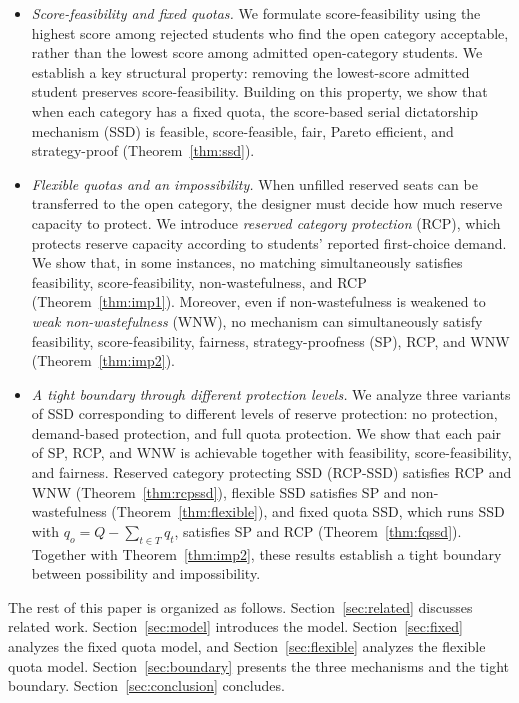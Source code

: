 \documentclass[a4paper,twoside]{article}
\theoremstyle{definition}
\begin{document}
\begin{itemize}
\item \emph{Score-feasibility and fixed quotas.}
We formulate score-feasibility using the highest score among
rejected students who find the open category acceptable, rather
than the lowest score among admitted open-category students.
We establish a key structural property: removing the lowest-score
admitted student preserves score-feasibility.
Building on this property, we show that when each category has
a fixed quota, the score-based serial dictatorship mechanism (SSD)
is feasible, score-feasible, fair, Pareto efficient, and
strategy-proof (Theorem~\ref{thm:ssd}).
\item \emph{Flexible quotas and an impossibility.}
When unfilled reserved seats can be transferred to the open
category, the designer must decide how much reserve capacity
to protect.
We introduce \emph{reserved category protection} (RCP),
which protects reserve capacity according to students'
reported first-choice demand.
We show that, in some instances, no matching simultaneously
satisfies feasibility, score-feasibility, non-wastefulness,
and RCP (Theorem~\ref{thm:imp1}).
Moreover, even if non-wastefulness is weakened to
\emph{weak non-wastefulness} (WNW), no mechanism
can simultaneously satisfy feasibility, score-feasibility,
fairness, strategy-proofness (SP), RCP, and WNW
(Theorem~\ref{thm:imp2}).
\item \emph{A tight boundary through different protection levels.}
We analyze three variants of SSD corresponding to different
levels of reserve protection: no protection, demand-based
protection, and full quota protection.
We show that each pair of SP, RCP, and WNW is achievable
together with feasibility, score-feasibility, and fairness.
Reserved category protecting SSD (RCP-SSD) satisfies RCP and WNW
(Theorem~\ref{thm:rcpssd}),
flexible SSD satisfies SP and non-wastefulness
(Theorem~\ref{thm:flexible}), and
fixed quota SSD, which runs SSD with
$q_o=Q-\sum_{t\in T}q_t$, satisfies SP and RCP
(Theorem~\ref{thm:fqssd}).
Together with Theorem~\ref{thm:imp2}, these results establish
a tight boundary between possibility and impossibility.
\end{itemize}

The rest of this paper is organized as follows.
Section~\ref{sec:related} discusses related work.
Section~\ref{sec:model} introduces the model.
Section~\ref{sec:fixed} analyzes the fixed quota model, and
Section~\ref{sec:flexible} analyzes the flexible quota model.
Section~\ref{sec:boundary} presents the three mechanisms and the tight boundary.
Section~\ref{sec:conclusion} concludes.
\end{document}
